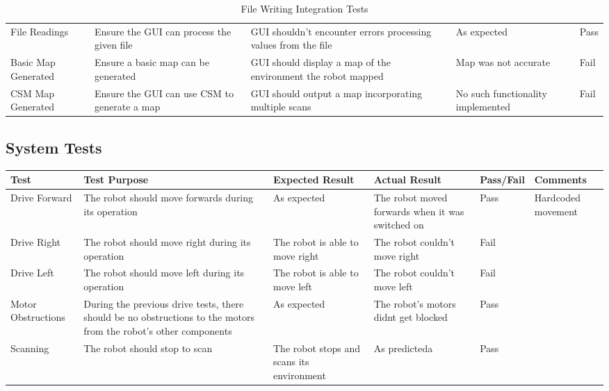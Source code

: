 \begin{landscape}
\begin{table}[h!]
\begin{tabular}{| p{2.5cm} | p{5cm} | p{4cm} | p{3cm} | p{1.5cm} |}
							File Readings & Ensure the GUI can process the given file & GUI shouldn't encounter errors processing values from the file & As expected & Pass \\
							
							Basic Map Generated & Ensure a basic map can be generated  & GUI should display a map of the environment the robot mapped & Map was not accurate & Fail \\ 
							
							CSM Map Generated & Ensure the GUI can use CSM to generate a map  & GUI should output a map incorporating multiple scans & No such functionality implemented & Fail \\ [1ex] 
							\hline
						\end{tabular}
						\caption{File Writing Integration Tests}
						\label{table:mappingtests}		
					\end{table}
				
				\subsection{System Tests}
				\begin{table}[h!]
					\centering
					\begin{tabular}{| p{2.5cm} | p{5cm} | p{4cm} | p{4cm} | p{1.5cm} | p{2cm} |} 
						\hline
						Test & Test Purpose & Expected Result & Actual Result & Pass/Fail & Comments \\ [0.5ex] 
						\hline
						Drive Forward & The robot should move forwards during its operation & As expected & The robot moved forwards when it was switched on & Pass & Hardcoded movement  \\
							
						Drive Right & The robot should move right during its operation & The robot is able to move right & The robot couldn't move right & Fail &   \\
							
						Drive Left & The robot should move left during its operation & The robot is able to move left & The robot couldn't move left & Fail &   \\
							
						Motor Obstructions & During the previous drive tests, there should be no obstructions to the motors from the robot's other components & As expected & The robot's motors didnt get blocked & Pass &   \\
							
						Scanning & The robot should stop to scan & The robot stops and scans its environment & As predicteda & Pass &   \\ 
							

\end{tabular}
\end{table}
\end{landscape}
